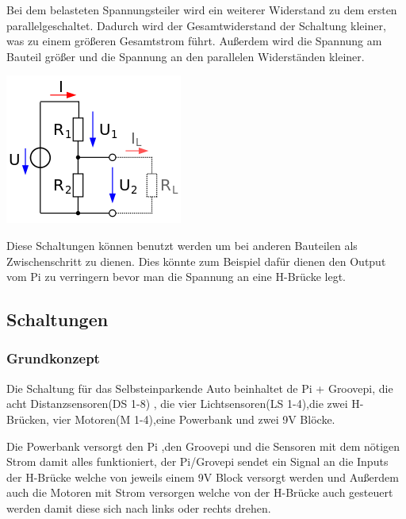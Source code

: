 \documentclass[notitlepage]{report}
\begin{document}
Bei dem belasteten Spannungsteiler wird ein weiterer Widerstand zu dem ersten parallelgeschaltet. Dadurch wird der Gesamtwiderstand der Schaltung kleiner, was zu einem größeren Gesamtstrom führt. Außerdem wird die Spannung am Bauteil größer und die Spannung an den parallelen Widerständen kleiner. 

\includegraphics[scale=1]{Spannungsteiler_be.png}

Diese Schaltungen können benutzt werden um bei anderen Bauteilen als Zwischenschritt zu dienen. Dies könnte zum Beispiel dafür dienen den Output vom Pi zu verringern bevor man die Spannung an eine H-Brücke legt. 

\subsection{Schaltungen}

\subsubsection{Grundkonzept}

Die Schaltung f\"{u}r das Selbsteinparkende Auto beinhaltet de Pi + Groovepi, die acht Distanzsensoren(DS 1-8) , die vier Lichtsensoren(LS 1-4),die zwei H-Br\"{u}cken, vier Motoren(M 1-4),eine Powerbank und zwei 9V Bl\"{o}cke.

Die Powerbank versorgt den Pi ,den Groovepi und die Sensoren mit dem n\"{o}tigen Strom damit alles funktioniert, der Pi/Grovepi sendet ein Signal an die Inputs der H-Br\"{u}cke welche von jeweils einem 9V Block versorgt werden und Au{\ss}erdem auch die Motoren mit Strom versorgen welche von der H-Br\"{u}cke auch gesteuert werden damit diese sich nach links oder rechts drehen.
\end{document}
